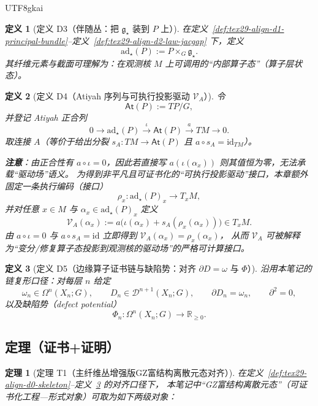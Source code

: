 \documentclass[12pt]{article}
\newtheorem{definition}{定义}[section]
\newtheorem{theorem}{定理}[section]
\newcommand{\RR}{\mathbb{R}}
\newcommand{\GZMonState}{\texorpdfstring{GZ富结构离散元态}{GZ富结构离散元态}}
\begin{document}
\begin{CJK*}{UTF8}{gkai}
\begin{definition}[定义 D3（伴随丛：把 $\mathfrak{g}_{\star}$ 装到 $P$ 上）]
\label{def:tex29-align-d3-adjoint}
在定义~\ref{def:tex29-align-d1-principal-bundle}--定义~\ref{def:tex29-align-d2-law-jacgap} 下，定义
\[
  \mathrm{ad}_{\star}(P):=P\times_G \mathfrak{g}_{\star}.
\]
其纤维元素与截面可理解为：在观测核 $M$ 上可调用的“内部算子态”（算子层状态）。
\end{definition}

\begin{definition}[定义 D4（Atiyah 序列与可执行投影驱动 $\mathcal{V}_A$）]
\label{def:tex29-align-d4-atiyah-drive}
令
\[
  \mathsf{At}(P):=TP/G,
\]
并登记 Atiyah 正合列
\[
  0\longrightarrow \mathrm{ad}_{\star}(P)\xrightarrow{\ \iota\ }\mathsf{At}(P)\xrightarrow{\ a\ }TM\longrightarrow 0.
\]
取连接 $A$（等价于给出分裂 $s_A:TM\to\mathsf{At}(P)$ 且 $a\circ s_A=\mathrm{id}_{TM}$）。

\textbf{注意}：由正合性有 $a\circ\iota=0$，因此若直接写 $a(\iota(\alpha_x))$ 则其值恒为零，无法承载“驱动场”语义。
为得到非平凡且可证书化的“可执行投影驱动”接口，本章额外固定一条执行编码（接口）
\[
  \rho_x:\mathrm{ad}_{\star}(P)_x\to T_xM,
\]
并对任意 $x\in M$ 与 $\alpha_x\in \mathrm{ad}_{\star}(P)_x$ 定义
\[
  \mathcal{V}_A(\alpha_x)
  :=a\bigl(\iota(\alpha_x)+s_A(\rho_x(\alpha_x))\bigr)
  \in T_xM.
\]
由 $a\circ\iota=0$ 与 $a\circ s_A=\mathrm{id}$ 立即得到 $\mathcal{V}_A(\alpha_x)=\rho_x(\alpha_x)$，
从而 $\mathcal{V}_A$ 可被解释为“变分/修复算子态投影到观测核的驱动场”的严格可计算接口。
\end{definition}

\begin{definition}[定义 D5（边缘算子证书链与缺陷势：对齐 $\partial D=\omega$ 与 $\Phi$）]
\label{def:tex29-align-d5-edge-cert-phi}
沿用本笔记的链复形口径：对每层 $n$ 给定
\[
  \omega_n\in\Omega^n(X_n;G),
  \qquad
  D_n\in\mathcal{D}^{n+1}(X_n;G),
  \qquad
  \partial D_n=\omega_n,
  \qquad
  \partial^2=0,
\]
以及缺陷势（defect potential）
\[
  \Phi_n:\Omega^n(X_n;G)\to\RR_{\ge 0}.
\]
\end{definition}

\subsection{定理（证书+证明）}
\label{subsec:tex29-mon-cfg-proj-bundle-alignment-thm}

\begin{theorem}[定理 T1（主纤维丛增强版\GZMonState{}对齐）]
\label{thm:tex29-monad-state-alignment}
在定义~\ref{def:tex29-align-d0-skeleton}--定义~\ref{def:tex29-align-d5-edge-cert-phi} 的对齐口径下，
本笔记中“\GZMonState{}”（可证书化工程—形式对象）可取为如下两级对象：


\end{theorem}
\end{CJK*}
\end{document}
